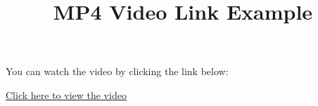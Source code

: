\documentclass{article}
\begin{document}
\title{MP4 Video Link Example}
\author{}
\date{}

\maketitle

You can watch the video by clicking the link below:

\href{run:./pictures/solution_evolution.mp4}{Click here to view the video}
\end{document}
